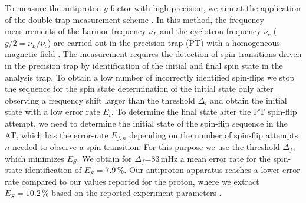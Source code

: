 \documentclass[preprint%
]{elsarticle}
\begin{document}
To measure the antiproton $g$-factor with high precision, we aim at the application of the double-trap measurement scheme \cite{haeffner2003double,MooserPLB2013}. In this method, the frequency measurements of the Larmor frequency $\nu_L$ and the cyclotron frequency $\nu_c$ ($g/2 = \nu_L/\nu_c$) are carried out in the precision trap (PT) with a homogeneous magnetic field \cite{MooserNature2014}. The measurement requires the detection of spin transitions driven in the precision trap by identification of the initial and final spin state in the analysis trap. To obtain a low number of incorrectly identified spin-flips we stop the sequence for the spin state determination of the initial state only after observing a frequency shift larger than the threshold $\Delta_i$ and obtain the initial state with a low error rate $E_i$. To determine the final state after the PT spin-flip attempt, we need to determine the initial state of the spin-flip sequence in the AT, which has the error-rate $E_{f,n}$ depending on the number of spin-flip attempts $n$ needed to observe a spin transition. For this purpose we use the threshold $\Delta_f$, which minimizes $E_S$. We obtain for $\Delta_f$=83$\,$mHz a mean error rate for the spin-state identification of $E_S=7.9\,\%$. Our antiproton apparatus reaches a lower error rate compared to our values reported for the proton, where we extract $E_S = 10.2\,\%$ based on the reported experiment parameters \cite{MooserPRL2013}.
\end{document}
